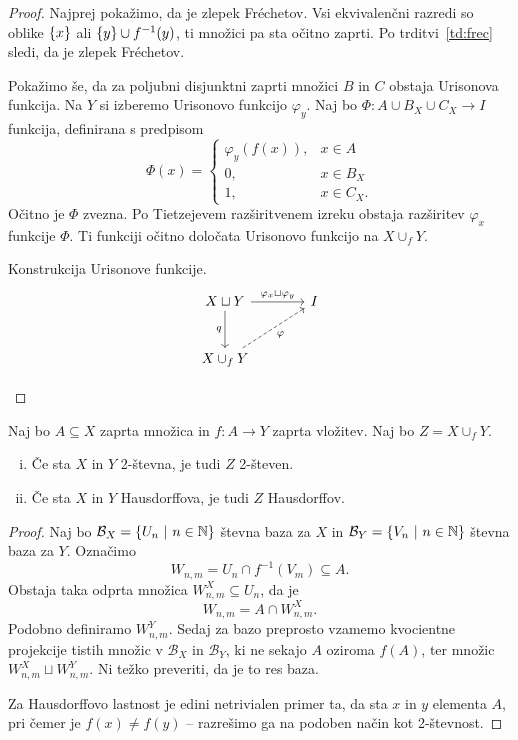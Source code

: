 \begin{proof}
Najprej pokažimo, da je zlepek Fréchetov. Vsi ekvivalenčni razredi
so oblike $\left\{x\right\}$ ali $\left\{y\right\} \cup f^{-1}(y)$, ti množici pa sta
očitno zaprti. Po trditvi~\ref{td:frec} sledi, da je zlepek
Fréchetov.

Pokažimo še, da za poljubni disjunktni zaprti množici $B$ in $C$
obstaja Urisonova funkcija. Na $Y$ si izberemo Urisonovo funkcijo
$\varphi_y$. Naj bo $\Phi \colon A \cup B_X \cup C_X \to I$
funkcija, definirana s predpisom
\[
\Phi(x) =
\begin{cases}
\varphi_y(f(x)), & x \in A \\
0,               & x \in B_X \\
1,               & x \in C_X.
\end{cases}
\]
Očitno je $\Phi$ zvezna. Po Tietzejevem razširitvenem izreku
obstaja razširitev $\varphi_x$ funkcije $\Phi$. Ti funkciji očitno
določata Urisonovo funkcijo na $X \cup_f Y$.

\begin{skica}{Konstrukcija Urisonove funkcije.}
\[
\begin{tikzcd}[column sep=large, row sep=large]
X \sqcup Y
\arrow[r, "\varphi_x \sqcup \varphi_y"]
\arrow[d, "q"']
& I \\
X \cup_f Y \arrow[ur, dashrightarrow, "\varphi"'] &
\end{tikzcd} \qedhere
\]
\end{skica}
\end{proof}

\begin{trditev}
Naj bo $A \subseteq X$ zaprta množica in $f \colon A \to Y$ zaprta
vložitev. Naj bo $Z = X \cup_f Y$.

\begin{enumerate}[i)]
\item Če sta $X$ in $Y$ 2-števna, je tudi $Z$ 2-števen.
\item Če sta $X$ in $Y$ Hausdorffova, je tudi $Z$ Hausdorffov.
\end{enumerate}
\end{trditev}

\begin{proof}
Naj bo $\mathcal{B}_X = \left\{U_n~\middle\vert~n \in \mathbb{N}\right\}$ števna baza za $X$ in
$\mathcal{B}_Y = \left\{V_n~\middle\vert~n \in \mathbb{N}\right\}$ števna baza za $Y$. Označimo
\[
W_{n,m} = U_n \cap f^{-1}(V_m) \subseteq A.
\]
Obstaja taka odprta množica $W_{n,m}^X \subseteq U_n$, da je
\[
W_{n,m} = A \cap W_{n,m}^X.
\]
Podobno definiramo $W_{n,m}^Y$. Sedaj za bazo preprosto vzamemo
kvocientne projekcije tistih množic v $\mathcal{B}_X$ in
$\mathcal{B}_Y$, ki ne sekajo $A$ oziroma $f(A)$, ter množic
$W_{n,m}^X \sqcup W_{n,m}^Y$. Ni težko preveriti, da je to res
baza.

Za Hausdorffovo lastnost je edini netrivialen primer ta, da sta
$x$ in $y$ elementa $A$, pri čemer je $f(x) \ne f(y)$ -- razrešimo
ga na podoben način kot 2-števnost.
\end{proof}

